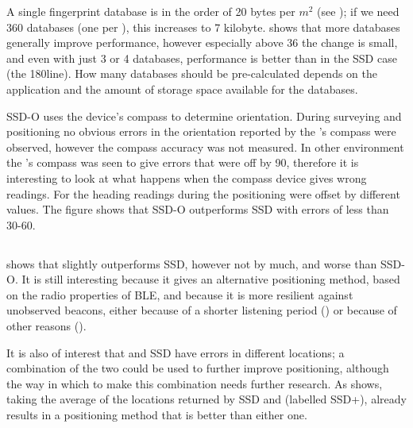 A single fingerprint database is in the order of 20 bytes per $m^2$ (see ); if we need 360 databases (one per \tdegree), this increases to 7 kilobyte.
 shows that more databases generally improve performance, however especially above 36 the change is small, and even with just 3 or 4 databases, performance is better than in the SSD case (the 180\tdegree line).
How many databases should be pre-calculated depends on the application and the amount of storage space available for the databases.

SSD-O uses the device's compass to determine orientation.
During surveying and positioning no obvious errors in the orientation reported by the \device's compass were observed, however the compass accuracy was not measured.
In other environment the \device's compass was seen to give errors that were off by 90\tdegree, therefore it is interesting to look at what happens when the compass device gives wrong readings.
For  the heading readings during the positioning were offset by different values.
The figure shows that SSD-O outperforms SSD with errors of less than 30-60\tdegree.

\subsection{\BRP}
 shows that \aBRP slightly outperforms SSD, however not by much, and worse than SSD-O.
It is still interesting because it gives an alternative positioning method, based on the radio properties of BLE, and because it is more resilient against unobserved beacons, either because of a shorter listening period () or because of other reasons ().

It is also of interest that \aBRP and SSD have errors in different locations; a combination of the two could be used to further improve positioning, although the way in which to make this combination needs further research.
As  shows, taking the average of the locations returned by SSD and \aBRP (labelled SSD+\aBRP), already results in a positioning method that is better than either one.

